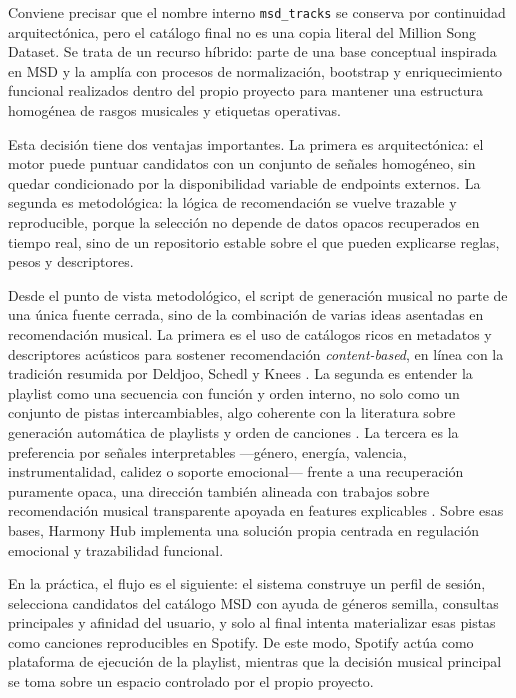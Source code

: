 Conviene precisar que el nombre interno \texttt{msd\_tracks} se conserva por
continuidad arquitectónica, pero el catálogo final no es una copia literal del
Million Song Dataset. Se trata de un recurso híbrido: parte de una base
conceptual inspirada en MSD y la amplía con procesos de normalización,
bootstrap y enriquecimiento funcional realizados dentro del propio proyecto
para mantener una estructura homogénea de rasgos musicales y etiquetas
operativas.

Esta decisión tiene dos ventajas importantes. La primera es arquitectónica: el
motor puede puntuar candidatos con un conjunto de señales homogéneo, sin quedar
condicionado por la disponibilidad variable de endpoints externos. La segunda
es metodológica: la lógica de recomendación se vuelve trazable y reproducible,
porque la selección no depende de datos opacos recuperados en tiempo real, sino
de un repositorio estable sobre el que pueden explicarse reglas, pesos y
descriptores.

Desde el punto de vista metodológico, el script de generación musical no parte
de una única fuente cerrada, sino de la combinación de varias ideas asentadas
en recomendación musical. La primera es el uso de catálogos ricos en metadatos
y descriptores acústicos para sostener recomendación \textit{content-based}, en
línea con la tradición resumida por Deldjoo, Schedl y Knees
\cite{deldjoo_2021_contentdriven}. La segunda es entender la playlist como una
secuencia con función y orden interno, no solo como un conjunto de pistas
intercambiables, algo coherente con la literatura sobre generación automática
de playlists y orden de canciones \cite{vall_2018_playlist_order}. La tercera
es la preferencia por señales interpretables —género, energía, valencia,
instrumentalidad, calidez o soporte emocional— frente a una recuperación
puramente opaca, una dirección también alineada con trabajos sobre
recomendación musical transparente apoyada en features explicables
\cite{lee_2018_transparent_music}. Sobre esas bases, Harmony Hub implementa una
solución propia centrada en regulación emocional y trazabilidad funcional.

En la práctica, el flujo es el siguiente: el sistema construye un perfil de
sesión, selecciona candidatos del catálogo MSD con ayuda de géneros semilla,
consultas principales y afinidad del usuario, y solo al final intenta
materializar esas pistas como canciones reproducibles en Spotify. De este modo,
Spotify actúa como plataforma de ejecución de la playlist, mientras que la
decisión musical principal se toma sobre un espacio controlado por el propio
proyecto.

